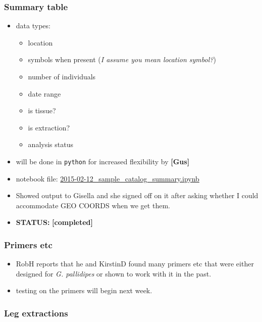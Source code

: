 \documentclass[letterpaper]{scrartcl}
\begin{document}
\subsubsection{Summary table}\label{summary-table}

\begin{itemize}
\item
  data types:

  \begin{itemize}
  \itemsep1pt\parskip0pt
  \item
    location
  \item
    symbols when present (\emph{I assume you mean location symbol?})
  \item
    number of individuals
  \item
    date range
  \item
    is tissue?
  \item
    is extraction?
  \item
    analysis status
  \end{itemize}
\item
  will be done in \texttt{python} for increased flexibility by
  \textbf{{[}Gus{]}}
\item
  notebook file:
  \href{file:///home/gus/Dropbox/common/ipy_notebooks/YALE/pallidipes_kenya/2015-02-12_sample_catalog_summary.ipynb}{2015-02-12\_sample\_catalog\_summary.ipynb}
\item
  Showed output to Gisella and she signed off on it after asking whether
  I could accommodate GEO COORDS when we get them.
\item
  \textbf{STATUS:} \textbf{{[}completed{]}}
\end{itemize}

\subsubsection{Primers etc}\label{primers-etc}

\begin{itemize}
\itemsep1pt\parskip0pt
\item
  RobH reports that he and KirstinD found many primers etc that were
  either designed for \emph{G. pallidipes} or shown to work with it in
  the past.
\item
  testing on the primers will begin next week.
\end{itemize}

\subsubsection{Leg extractions}\label{leg-extractions}
\end{document}
